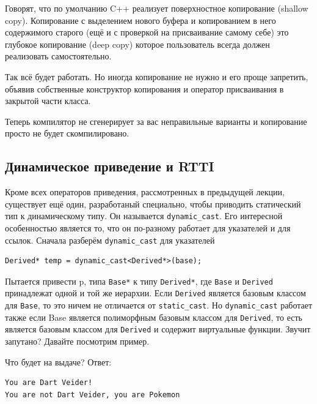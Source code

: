 \documentclass[a4paper,12pt,oneside]{article}
\begin{document}
Говорят, что по умолчанию C++ реализует поверхностное копирование (shallow copy). Копирование с выделением нового буфера и копированием в него содержимого старого (ещё и с проверкой на присваивание самому себе) это глубокое копирование (deep copy) которое пользователь всегда должен реализовать самостоятельно.



Так всё будет работать. Но иногда копирование не нужно и его проще запретить, объявив собственные конструктор копирования и оператор присваивания в закрытой части класса.



Теперь компилятор не сгенерирует за вас неправильные варианты и копирование просто не будет скомпилировано.

\subsection{Динамическое приведение и RTTI}

Кроме всех операторов приведения, рассмотренных в предыдущей лекции, существует ещё один, разработаный специально, чтобы приводить статический тип к динамическому типу. Он называется \lstinline!dynamic_cast!. Его интересной особенностью является то, что он по-разному работает для указателей и для ссылок. Сначала разберём \lstinline!dynamic_cast! для указателей

\begin{lstlisting}
Derived* temp = dynamic_cast<Derived*>(base);
\end{lstlisting}

Пытается привести p, типа \lstinline!Base*! к типу \lstinline!Derived*!, где \lstinline!Base! и \lstinline!Derived! принадлежат одной и той же иерархии. Если \lstinline!Derived! является базовым классом для \lstinline!Base!, то это ничем не отличается от \lstinline!static_cast!. Но \lstinline!dynamic_cast! работает также если Base является полиморфным базовым классом для \lstinline!Derived!, то есть является базовым классом для \lstinline!Derived! и содержит виртуальные функции. Звучит запутано? Давайте посмотрим пример.



Что будет на выдаче? Ответ:

\begin{lstlisting}[language=make]
You are Dart Veider!
You are not Dart Veider, you are Pokemon
\end{lstlisting}
\end{document}

